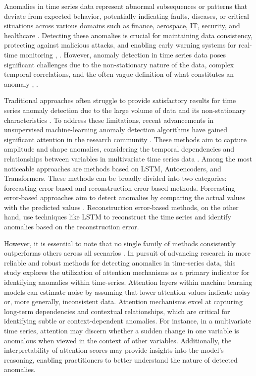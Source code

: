 \documentclass[conference]{IEEEtran}
\begin{document}
Anomalies in time series data represent abnormal subsequences or patterns that deviate from expected behavior, potentially indicating faults, diseases, or critical situations across various domains such as finance, aerospace, IT, security, and healthcare \cite{geiger_tadgan:_2020,ji_novel_2021}.
Detecting these anomalies is crucial for maintaining data consistency, protecting against malicious attacks, and enabling early warning systems for real-time monitoring \cite{ji_novel_2021}, \cite{laptev_generic_2015}. However, anomaly detection in time series data poses significant challenges due to the non-stationary nature of the data, complex temporal correlations, and the often vague definition of what constitutes an anomaly \cite{geiger_tadgan:_2020}, \cite{zhou_anomaly_2021}.

Traditional approaches often struggle to provide satisfactory results for time series anomaly detection due to the large volume of data and its non-stationary characteristics \cite{zhou_anomaly_2021}. To address these limitations, recent advancements in unsupervised machine-learning anomaly detection algorithms have gained significant attention in the research community \cite{audibert_deep_2022,geiger_tadgan:_2020}.
These methods aim to capture amplitude and shape anomalies, considering the temporal dependencies and relationships between variables in multivariate time series data \cite{choi_deep_2021}. Among the most noticeable approaches are methods based on LSTM, Autoencoders, and Transformers. These methods can be broadly divided into two categories: forecasting error-based and reconstruction error-based methods. Forecasting error-based approaches aim to detect anomalies by comparing the actual values with the predicted values \cite{yuan2024novelddpmbasedensembleapproach}. Reconstruction error-based methods, on the other hand, use techniques like LSTM to reconstruct the time series and identify anomalies based on the reconstruction error.

However, it is essential to note that no single family of methods consistently outperforms others across all scenarios \cite{audibert_deep_2022}. In pursuit of advancing research in more reliable and robust methods for detecting anomalies in time-series data, this study explores the utilization of attention mechanisms as a primary indicator for identifying anomalies within time-series. Attention layers within machine learning models can estimate noise by assuming that lower attention values indicate noisy or, more generally, inconsistent data. Attention mechanisms excel at capturing long-term dependencies and contextual relationships, which are critical for identifying subtle or context-dependent anomalies. For instance, in a multivariate time series, attention may discern whether a sudden change in one variable is anomalous when viewed in the context of other variables. Additionally, the interpretability of attention scores may provide insights into the model’s reasoning, enabling practitioners to better understand the nature of detected anomalies.
\end{document}

